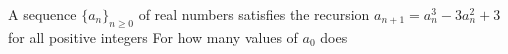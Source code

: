 A sequence $\{a_n\}_{n\geq 0}$ of real numbers satisfies the recursion $a_{n+1}=a_n^3-3a_n^2+3$ for all  positive integers   For how many values of $a_0$ does 